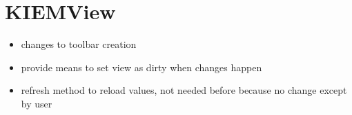 \section{KIEMView}
\begin{itemize}
 \item changes to toolbar creation
 \item provide means to set view as dirty when changes happen
 \item refresh method to reload values, not needed before because no change except by user
\end{itemize}